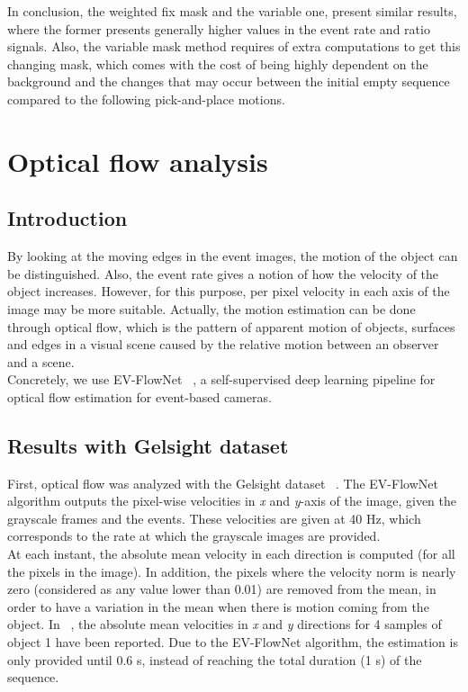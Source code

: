 In conclusion, the weighted fix mask and the variable one, present similar results, where the former presents generally higher values in the event rate and ratio signals. Also, the variable mask method requires of extra computations to get this changing mask, which comes with the cost of being highly dependent on the background and the changes that may occur between the initial empty sequence compared to the following pick-and-place motions.

\section{Optical flow analysis}

\subsection{Introduction}

By looking at the moving edges in the event images, the motion of the object can be distinguished. Also, the event rate gives a notion of how the velocity of the object increases. However, for this purpose, per pixel velocity in each axis of the image may be more suitable. Actually, the motion estimation can be done through optical flow, which is the pattern of apparent motion of objects, surfaces and edges in a visual scene caused by the relative motion between an observer and a scene.\\

Concretely, we use EV-FlowNet ~\cite{evflownet}, a self-supervised deep learning pipeline for optical flow estimation for event-based cameras. 

\subsection{Results with Gelsight dataset}

First, optical flow was analyzed with the Gelsight dataset ~\cite{gelsight2018}. The EV-FlowNet algorithm outputs the pixel-wise velocities in \textit{x} and \textit{y}-axis of the image, given the grayscale frames and the events. These velocities are given at 40 Hz, which corresponds to the rate at which the grayscale images are provided.\\

At each instant, the absolute mean velocity in each direction is computed (for all the pixels in the image). In addition, the pixels where the velocity norm is nearly zero (considered as any value lower than 0.01) are removed from the mean, in order to have a variation in the mean when there is motion coming from the object. In ~, the absolute mean velocities in \textit{x} and \textit{y} directions for 4 samples of object 1 have been reported. Due to the EV-FlowNet algorithm, the estimation is only provided until 0.6 s, instead of reaching the total duration (1 s) of the sequence.\\

